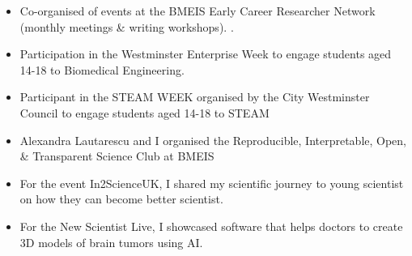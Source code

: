 \documentclass{mycv}
\begin{document}
\begin{itemize}
\item Co-organised of events at the BMEIS Early Career Researcher Network (monthly meetings \& writing workshops). 
	.
\item Participation in the Westminster Enterprise Week to engage students aged 14-18 to Biomedical Engineering. 
\item Participant in the STEAM WEEK organised by the City Westminster Council to engage students aged 14-18 to STEAM 
	\href{https://twitter.com/_mxochicale/status/1374407825607200769}{\faTwitter} 
\item Alexandra Lautarescu and I organised the Reproducible, Interpretable, Open, \& Transparent Science Club at BMEIS 
\item For the event In2ScienceUK, I shared my scientific journey to young scientist on how they can become better scientist.  
\item For the New Scientist Live, I showcased software that helps doctors to create 3D models of brain tumors using AI. 



\end{itemize}
\end{document}
